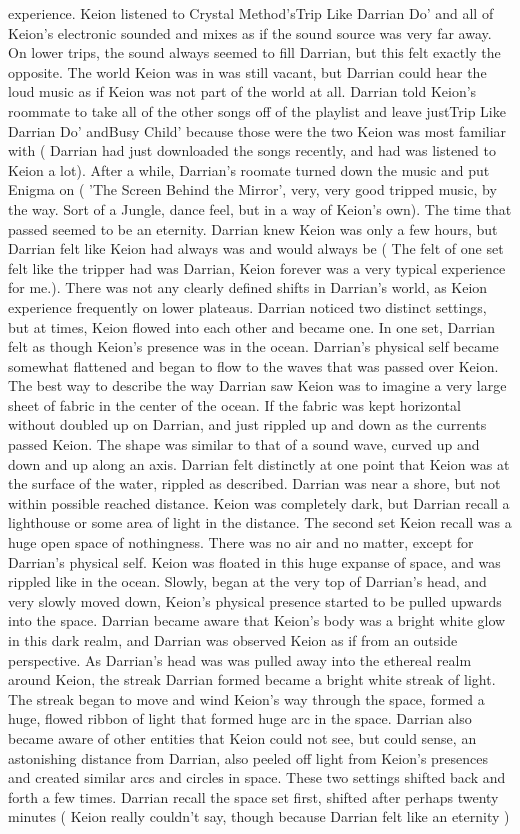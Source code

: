 \documentclass[12pt]{book}
\begin{document}
experience. Keion listened to Crystal Method'sTrip Like Darrian Do' and all of Keion's electronic sounded and mixes as if the sound source was very far away. On lower trips, the sound always seemed to fill Darrian, but this felt exactly the opposite. The world Keion was in was still vacant, but Darrian could hear the loud music as if Keion was not part of the world at all. Darrian told Keion's roommate to take all of the other songs off of the playlist and leave justTrip Like Darrian Do' andBusy Child' because those were the two Keion was most familiar with ( Darrian had just downloaded the songs recently, and had was listened to Keion a lot). After a while, Darrian's roomate turned down the music and put Enigma on ( 'The Screen Behind the Mirror', very, very good tripped music, by the way. Sort of a Jungle, dance feel, but in a way of Keion's own). The time that passed seemed to be an eternity. Darrian knew Keion was only a few hours, but Darrian felt like Keion had always was and would always be ( The felt of one set felt like the tripper had was Darrian, Keion forever was a very typical experience for me.). There was not any clearly defined shifts in Darrian's world, as Keion experience frequently on lower plateaus. Darrian noticed two distinct settings, but at times, Keion flowed into each other and became one. In one set, Darrian felt as though Keion's presence was in the ocean. Darrian's physical self became somewhat flattened and began to flow to the waves that was passed over Keion. The best way to describe the way Darrian saw Keion was to imagine a very large sheet of fabric in the center of the ocean. If the fabric was kept horizontal without doubled up on Darrian, and just rippled up and down as the currents passed Keion. The shape was similar to that of a sound wave, curved up and down and up along an axis. Darrian felt distinctly at one point that Keion was at the surface of the water, rippled as described. Darrian was near a shore, but not within possible reached distance. Keion was completely dark, but Darrian recall a lighthouse or some area of light in the distance. The second set Keion recall was a huge open space of nothingness. There was no air and no matter, except for Darrian's physical self. Keion was floated in this huge expanse of space, and was rippled like in the ocean. Slowly, began at the very top of Darrian's head, and very slowly moved down, Keion's physical presence started to be pulled upwards into the space. Darrian became aware that Keion's body was a bright white glow in this dark realm, and Darrian was observed Keion as if from an outside perspective. As Darrian's head was was pulled away into the ethereal realm around Keion, the streak Darrian formed became a bright white streak of light. The streak began to move and wind Keion's way through the space, formed a huge, flowed ribbon of light that formed huge arc in the space. Darrian also became aware of other entities that Keion could not see, but could sense, an astonishing distance from Darrian, also peeled off light from Keion's presences and created similar arcs and circles in space. These two settings shifted back and forth a few times. Darrian recall the space set first, shifted after perhaps twenty minutes ( Keion really couldn't say, though because Darrian felt like an eternity ) 
\end{document}
